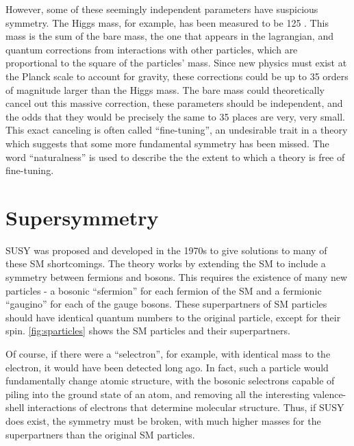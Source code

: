 However, some of these seemingly independent parameters have suspicious symmetry. The Higgs mass, for example, has been measured to be 125 \gev. This mass is the sum of the bare mass, the one that appears in the lagrangian, and quantum corrections from interactions with other particles, which are proportional to the square of the particles' mass. Since new physics must exist at the Planck scale to account for gravity, these corrections could be up to 35 orders of magnitude larger than the Higgs mass. The bare mass could theoretically cancel out this massive correction, these parameters should be independent, and the odds that they would be precisely the same to 35 places are very, very small. This exact canceling is often called ``fine-tuning'', an undesirable trait in a theory which suggests that some more fundamental symmetry has been missed. The word ``naturalness'' is used to describe the the extent to which a theory is free of fine-tuning. 


\section{Supersymmetry}

\ac{SUSY} was proposed and developed in the 1970s to give solutions to many of these \ac{SM} shortcomings. The theory works by extending the \ac{SM} to include a symmetry between fermions and bosons. This requires the existence of many new particles - a bosonic ``sfermion'' for each fermion of the \ac{SM} and a fermionic ``gaugino'' for each of the gauge bosons. These superpartners of \ac{SM} particles should have identical quantum numbers to the original particle, except for their spin. \autoref{fig:sparticles} shows the \ac{SM} particles and their superpartners.

Of course, if there were a ``selectron'', for example, with identical mass to the electron, it would have been detected long ago. In fact, such a particle would fundamentally change atomic structure, with the bosonic selectrons capable of piling into the ground state of an atom, and removing all the interesting valence-shell interactions of electrons that determine molecular structure. Thus, if \ac{SUSY} does exist, the symmetry must be broken, with much higher masses for the superpartners than the original \ac{SM} particles. 


